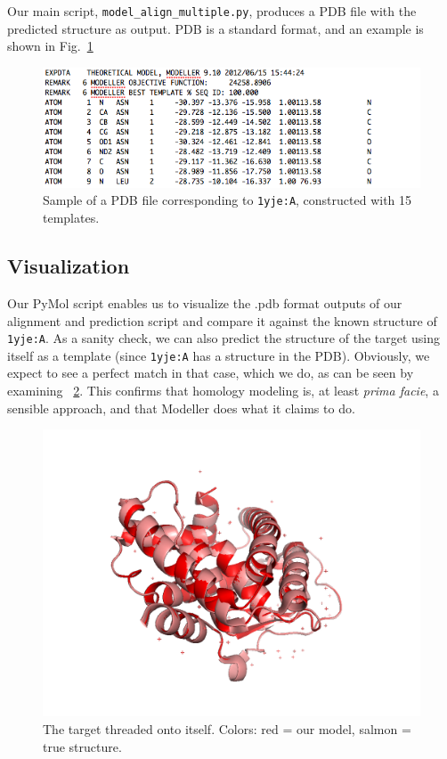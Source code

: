 \documentclass[notitlepage]{report}   %
\begin{document}
Our main script, \texttt{model\_align\_multiple.py}, produces a PDB file with the predicted structure as output. PDB is a standard format, and an example is shown in Fig.~\ref{fig:PDB}

\begin{figure}[h!]
\begin{center}
\includegraphics[scale=0.5]{output-15template.png}
 \caption{Sample of a PDB file corresponding to \texttt{1yje:A}, constructed with 15 templates.}
 \label{fig:PDB}
\end{center}
\end{figure}

\subsection*{Visualization}   
Our PyMol script enables us to visualize the .pdb format outputs of our alignment and prediction script and compare it against the known structure of \texttt{1yje:A}. As a sanity check, we can also predict the structure of the target using itself as a template (since \texttt{1yje:A} has a structure in the PDB). Obviously, we expect to see a perfect match in that case, which we do, as can be seen by examining \figurename~\ref{fig:truevtrue}. This confirms that homology modeling is, at least \textit{prima facie}, a sensible approach, and that Modeller does what it claims to do.

\begin{figure}[h!]
\begin{center}
  \includegraphics[width=0.8\linewidth]{real_vs_real.png}
\caption{The target threaded onto itself. Colors: red = our model, salmon = true structure.}
\label{fig:truevtrue}
\end{center}
\end{figure}
\end{document}
